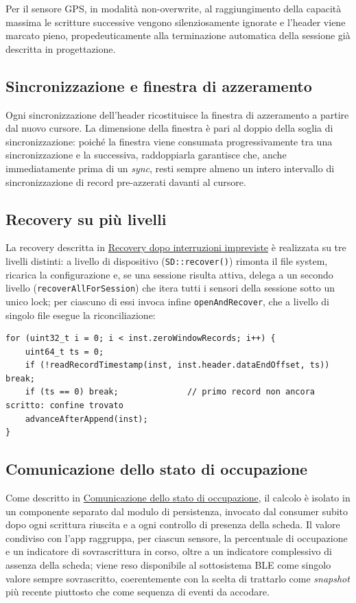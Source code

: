 Per il sensore GPS, in modalità non-overwrite, al raggiungimento della
capacità massima le scritture successive vengono silenziosamente ignorate e
l'header viene marcato pieno, propedeuticamente alla terminazione automatica
della sessione già descritta in progettazione.

\subsection{Sincronizzazione e finestra di azzeramento}
Ogni sincronizzazione dell'header ricostituisce la finestra di azzeramento a
partire dal nuovo cursore. La dimensione della finestra è pari al doppio della
soglia di sincronizzazione: poiché la finestra viene consumata progressivamente
tra una sincronizzazione e la successiva, raddoppiarla garantisce che, anche
immediatamente prima di un \textit{sync}, resti sempre almeno un intero intervallo di
sincronizzazione di record pre-azzerati davanti al cursore.

\subsection{Recovery su più livelli}
La recovery descritta in \hyperref[subsec:Recovery]{Recovery dopo interruzioni
impreviste} è realizzata su tre livelli distinti: a livello di dispositivo
(\texttt{SD::recover()}) rimonta il file system, ricarica la configurazione e,
se una sessione risulta attiva, delega a un secondo livello
(\texttt{recoverAllForSession}) che itera tutti i sensori della sessione sotto
un unico lock; per ciascuno di essi invoca infine \texttt{openAndRecover},
che a livello di singolo file esegue la riconciliazione:

\begin{listing}[H]
\begin{verbatim}
for (uint32_t i = 0; i < inst.zeroWindowRecords; i++) {
    uint64_t ts = 0;
    if (!readRecordTimestamp(inst, inst.header.dataEndOffset, ts)) break;
    if (ts == 0) break;              // primo record non ancora scritto: confine trovato
    advanceAfterAppend(inst);
}
\end{verbatim}
\caption{Riconciliazione del cursore in fase di recovery}
\label{listing:reconcile}
\end{listing}

\subsection{Comunicazione dello stato di occupazione}
Come descritto in \hyperref[subsec:storage_status]{Comunicazione dello stato di
occupazione}, il calcolo è isolato in un componente separato dal modulo di persistenza,
invocato dal consumer subito dopo ogni scrittura riuscita e a ogni controllo di
presenza della scheda. Il valore condiviso con l'app raggruppa, per ciascun sensore, la
percentuale di occupazione e un indicatore di sovrascrittura in corso, oltre a un
indicatore complessivo di assenza della scheda; viene reso disponibile al sottosistema BLE
come singolo valore sempre sovrascritto, coerentemente con la scelta di trattarlo come
\textit{snapshot} più recente piuttosto che come sequenza di eventi da accodare.

